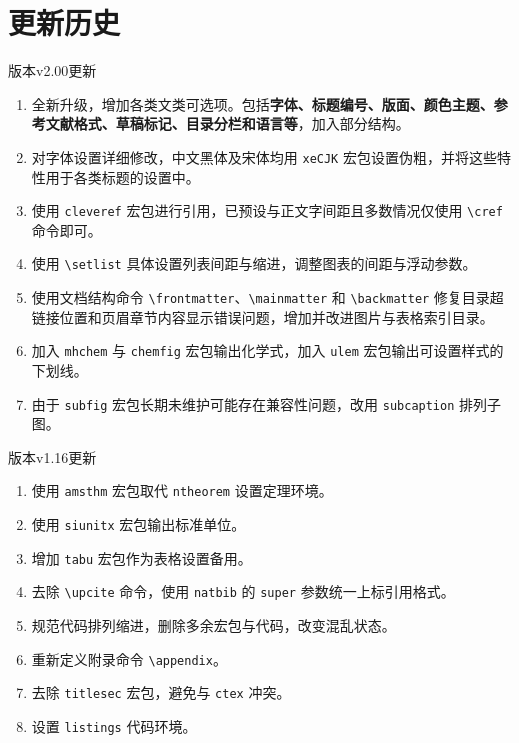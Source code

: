 
\chapter{更新历史}

\noindent\textsf{版本v2.00更新}
\begin{enumerate}[label=\color{three}\protect\circled{\arabic*}]
    \item 全新升级，增加各类文类可选项。包括\textbf{字体、标题编号、版面、颜色主题、参考文献格式、草稿标记、目录分栏和语言等}，加入\textsf{部分}结构。
    \item 对字体设置详细修改，中文黑体及宋体均用 \lstinline{xeCJK} 宏包设置伪粗，并将这些特性用于各类标题的设置中。
    \item 使用 \lstinline{cleveref} 宏包进行引用，已预设与正文字间距且多数情况仅使用 \lstinline{\cref} 命令即可。
    \item 使用 \lstinline{\setlist} 具体设置列表间距与缩进，调整图表的间距与浮动参数。
    \item 使用文档结构命令 \lstinline{\frontmatter}、\lstinline{\mainmatter} 和 \lstinline{\backmatter} 修复目录超链接位置和页眉章节内容显示错误问题，增加并改进图片与表格索引目录。
    \item 加入 \lstinline{mhchem} 与 \lstinline{chemfig} 宏包输出化学式，加入 \lstinline{ulem} 宏包输出可设置样式的下划线。
    \item 由于 \lstinline{subfig} 宏包长期未维护可能存在兼容性问题，改用 \lstinline{subcaption} 排列子图。
\end{enumerate}

\noindent\textsf{版本v1.16更新}
\begin{enumerate}[label=\color{three}\protect\circled{\arabic*}]
    \item 使用 \lstinline{amsthm} 宏包取代 \lstinline{ntheorem} 设置定理环境。
    \item 使用 \lstinline{siunitx} 宏包输出标准单位。
    \item 增加 \lstinline{tabu} 宏包作为表格设置备用。
    \item 去除 \lstinline{\upcite} 命令，使用 \lstinline{natbib} 的 \lstinline{super} 参数统一上标引用格式。
    \item 规范代码排列缩进，删除多余宏包与代码，改变混乱状态。
    \item 重新定义附录命令 \lstinline{\appendix}。
    \item 去除 \lstinline{titlesec} 宏包，避免与 \lstinline{ctex} 冲突。
    \item 设置 \lstinline{listings} 代码环境。 
\end{enumerate}

